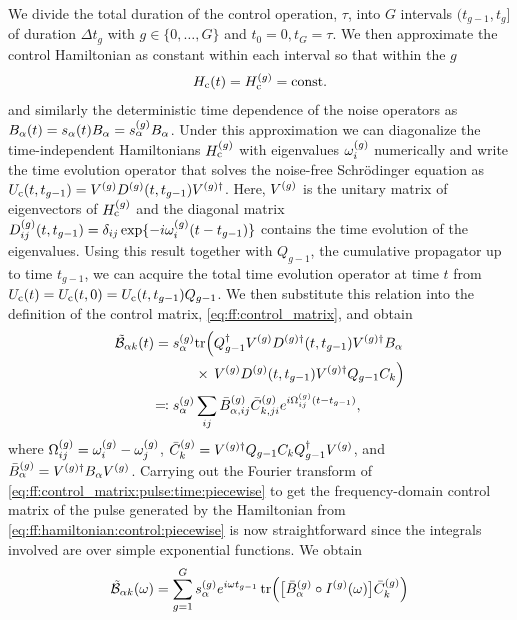 We divide the total duration of the control operation, $\tau$, into $G$ intervals $(t_{g-1}, t_{g}]$ of duration $\Delta t_g$ with $g\in\lbrace 0,\dotsc,G\rbrace$ and $t_0 =  0, t_G = \tau$.
We then approximate the control Hamiltonian as constant within each interval so that within the $g$
\begin{align}\label{eq:ff:hamiltonian:control:piecewise}
H_{\mathrm{c}}(t) = H_{\mathrm{c}}^{(g)} = \mathrm{const.}
\end{align}
and similarly the deterministic time dependence of the noise operators as $B_\alpha(t) = s_\alpha(t)B_\alpha = s_\alpha^{(g)}B_\alpha$.
Under this approximation we can diagonalize the time-independent Hamiltonians $H_{\mathrm{c}}^{(g)}$ with eigenvalues $\omega_i^{(g)}$ numerically and write the time evolution operator that solves the noise-free Schrödinger equation as $U_{\mathrm{c}}(t, t_{g-1}) = V^{(g)} D^{(g)}(t, t_{g-1})V^{(g)\dagger}$.
Here, $V^{(g)}$ is the unitary matrix of eigenvectors of $H_{\mathrm{c}}^{(g)}$ and the diagonal matrix $D_{ij}^{(g)}(t, t_{g-1}) = \delta_{ij}\exp\{-i\omega_i^{(g)}(t - t_{g-1})\}$ contains the time evolution of the eigenvalues.
Using this result together with $Q_{g-1}$, the cumulative propagator up to time $t_{g-1}$, we can acquire the total time evolution operator at time $t$ from $U_{\mathrm{c}}(t) = U_{\mathrm{c}}(t,0) = U_{\mathrm{c}}(t, t_{g-1}) Q_{g-1}$.
We then substitute this relation into the definition of the control matrix, \cref{eq:ff:control_matrix}, and obtain
\begin{align}
    \tilde{\mathcal{B}}_{\alpha k}(t) = s_\alpha^{(g)}&\mathrm{tr}\Bigl(Q_{g-1}^\dagger V^{(g)} D^{(g)\dagger}(t, t_{g-1}) V^{(g)\dagger} B_\alpha \notag\\
        & \times\,V^{(g)} D^{(g)}(t, t_{g-1})V^{(g)\dagger} Q_{g-1} C_k\Bigr) \\
        \eqqcolon s_\alpha^{(g)}&\sum_{ij}\bar{B}_{\alpha,ij}^{(g)}\bar{C}_{k,ji}^{(g)}
        e^{i\Omega_{ij}^{(g)}(t - t_{g-1})}, \label{eq:ff:control_matrix:pulse:time:piecewise}
\end{align}
where $\Omega_{ij}^{(g)} = \omega_i^{(g)} - \omega_j^{(g)}$, $\bar{C}_{k}^{(g)} = V^{(g)\dagger} Q_{g-1} C_k Q_{g-1}^\dagger V^{(g)}$, and $\bar{B}_{\alpha}^{(g)} = V^{(g)\dagger} B_\alpha V^{(g)}$.
Carrying out the Fourier transform of \cref{eq:ff:control_matrix:pulse:time:piecewise} to get the frequency-domain control matrix of the pulse generated by the Hamiltonian from \cref{eq:ff:hamiltonian:control:piecewise} is now straightforward since the integrals involved are over simple exponential functions.
We obtain
\begin{equation}\label{eq:ff:control_matrix:pulse:freq:ff:calculation}
    \tilde{\mathcal{B}}_{\alpha k}(\omega) = \sum_{g = 1}^G s_\alpha^{(g)}e^{i\omega t_{g-1}}\tr(\bigl[\bar{B}_\alpha^{(g)}\circ I^{(g)}(\omega)\bigr]\bar{C}_k^{(g)})
\end{equation}
